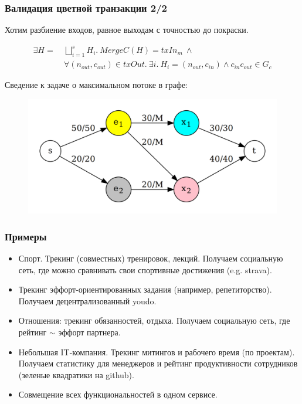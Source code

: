\documentclass[11pt,handout,pdf,hyperref={unicode}]{beamer}
\begin{document}
\begin{frame}
  \frametitle{Валидация цветной транзакции 2/2}

  Хотим разбиение входов, равное выходам с точностью до покраски.

  \begin{align*}
    \exists H = \ &\bigsqcup_{i=1}^s{H_i}. \ MergeC(H) = txIn_m \ \wedge \nonumber \\
                  &\forall (n_{out},c_{out}) \in txOut . \ \exists i . \ H_i = (n_{out},c_{in}) \wedge c_{in}c_{out} \in G_c \label{eq:1}
  \end{align*}

  Сведение к задаче о максимальном потоке в графе:

  \begin{figure}[t]
  \includegraphics[scale=0.12]{pres_colortx_graph}
  \centering
  \end{figure}
\end{frame}


\begin{frame}
  \frametitle{Примеры}

  \begin{itemize}
    \item Спорт. Трекинг (совместных) тренировок, лекций. Получаем
      социальную сеть, где можно сравнивать свои спортивные достижения
      (e.g. strava).
    \item Трекинг эффорт-ориентированных задания (например,
      репетиторство). Получаем децентрализованный youdo.
    \item Отношения: трекинг обязанностей, отдыха. Получаем социальную
      сеть, где рейтинг $\sim$ эффорт партнера.
    \item Небольшая IT-компания. Трекинг митингов и рабочего время (по
      проектам). Получаем статистику для менеджеров и рейтинг
      продуктивности сотрудников (зеленые квадратики на github).
    \item Совмещение всех функциональностей в одном сервисе.
  \end{itemize}
\end{frame}
\end{document}
